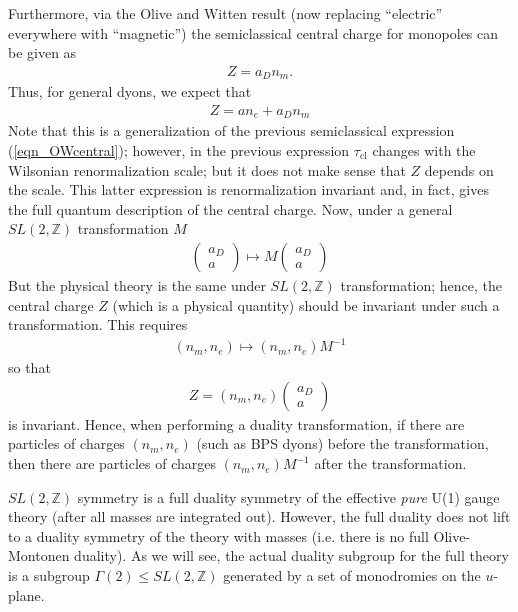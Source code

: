 \documentclass[12pt, onecolumn]{article}
\newenvironment{remark}[1][Remark]{\begin{trivlist}
\item[\hskip \labelsep {\bfseries #1}]}{\end{trivlist}}
\begin{document}
\vspace{5mm}

\noindent Furthermore, via the Olive and Witten result (now replacing ``electric'' everywhere with ``magnetic'') the semiclassical central charge for monopoles can be given as
\begin{align*}
Z=a_{D} n_{m}.
\end{align*}
Thus, for general dyons, we expect that
\begin{align*}
Z=a n_{e} + a_{D} n_{m}
\end{align*}
Note that this is a generalization of the previous semiclassical expression (\ref{eqn_OWcentral}); however, in the previous expression $\tau_{\text{cl}}$ changes with the Wilsonian renormalization scale; but it does not make sense that $Z$ depends on the scale.  This latter expression is renormalization invariant and, in fact, gives the full quantum description of the central charge.  Now, under a general $SL(2,\mathbb{Z})$ transformation $M$
\begin{align*}
\left(
\begin{array}{c}
a_D\\
a
\end{array}
\right) \mapsto M\left(
\begin{array}{c}
a_D\\
a
\end{array}
\right)
\end{align*}
But the physical theory is the same under $SL(2,\mathbb{Z})$ transformation; hence, the central charge $Z$ (which is a physical quantity) should be invariant under such a transformation.  This requires
\begin{align*}
(n_{m}, n_{e}) \mapsto (n_{m},n_{e})M^{-1}
\end{align*}
so that
\begin{align*}
Z=(n_{m},n_{e})\left(
\begin{array}{c}
a_D\\
a
\end{array}
\right)
\end{align*}
is invariant.  Hence, when performing a duality transformation, if there are particles of charges $(n_{m},n_{e})$ (such as BPS dyons) before the transformation, then there are particles of charges $(n_{m},n_{e})M^{-1}$ after the transformation.

\begin{remark}
$SL(2,\mathbb{Z})$ symmetry is a full duality symmetry of the effective \textit{pure} U(1) gauge theory (after all masses are integrated out).  However, the full duality does not lift to a duality symmetry of the theory with masses (i.e. there is no full Olive-Montonen duality).  As we will see, the actual duality subgroup for the full theory is a subgroup $\Gamma(2) \leq SL(2,\mathbb{Z})$ generated by a set of monodromies on the $u$-plane.
\end{remark}
\end{document}
